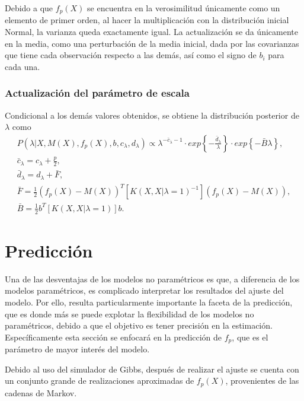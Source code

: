 Debido a que $f_p(X)$ se encuentra en la verosimilitud  \'unicamente como un elemento de primer orden, al hacer la multiplicaci\'on con la distribuci\'on inicial Normal, la varianza queda exactamente igual. La actualizaci\'on se da \'unicamente en la media, como una perturbaci\'on de la media inicial, dada por las covarianzas que tiene cada observaci\'on respecto a las dem\'as, as\'i como el signo de $b_i$ para cada una.

\subsubsection{Actualizaci\'on del par\'ametro de escala}

Condicional a los dem\'as valores obtenidos, se obtiene la distribuci\'on posterior  de $\lambda$ como
\begin{equation*}
\begin{gathered}
   P(\lambda|X,M(X),f_p(X),b,c_\lambda,d_\lambda) 
   \propto
   \lambda^{-\bar{c}_\lambda-1}
   \cdot
   exp\left\{- \frac{\bar{d}_\lambda}{\lambda}\right\}
   \cdot
   exp\left\{-\bar{B} \lambda\right\}, \\
   \bar{c}_\lambda = c_\lambda + \frac{p}{2}, \\
   \bar{d}_\lambda = d_\lambda + \bar{F}, \\
   \bar{F} = \frac{1}{2}(f_p(X)-M(X))^T [K(X,X|\lambda=1)^{-1}] (f_p(X)-M(X)), \\
   \bar{B} = \frac{1}{2}b^T [K(X,X|\lambda=1)] b.
\end{gathered}
\end{equation*}

\section{Predicci\'on}

Una de las desventajas de los modelos no param\'etricos es que, a diferencia de los modelos param\'etricos, es complicado interpretar los resultados del ajuste del modelo. Por ello, resulta particularmente importante la faceta de la predicci\'on, que es donde m\'as se puede explotar la flexibilidad de los modelos no param\'etricos, debido a que el objetivo es tener precisi\'on en la estimaci\'on. Espec\'ificamente esta secci\'on se enfocar\'a en la predicci\'on de $f_p$, que es el par\'ametro de mayor inter\'es del modelo.

Debido al uso del simulador de Gibbs, despu\'es de realizar el ajuste se cuenta con un conjunto grande de realizaciones aproximadas de $f_p(X)$, provenientes de las cadenas de Markov.

